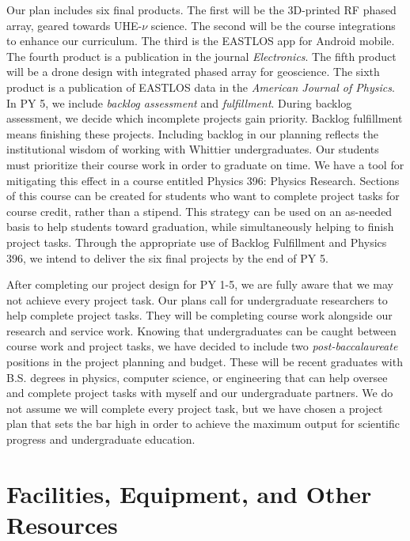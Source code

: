 \documentclass[10pt]{amsart}
\theoremstyle{definition}
\numberwithin{equation}{section}
\begin{document}
Our plan includes six final products.  The first will be the 3D-printed RF phased array, geared towards UHE-$\nu$ science.  The second will be the course integrations to enhance our curriculum.  The third is the EASTLOS app for Android mobile.  The fourth product is a publication in the journal \textit{Electronics}.  The fifth product will be a drone design with integrated phased array for geoscience.  The sixth product is a publication of EASTLOS data in the \textit{American Journal of Physics}.  In PY 5, we include \textit{backlog assessment} and \textit{fulfillment}.  During backlog assessment, we decide which incomplete projects gain priority.  Backlog fulfillment means finishing these projects.  Including backlog in our planning reflects the institutional wisdom of working with Whittier undergraduates.  Our students must prioritize their course work in order to graduate on time.  We have a tool for mitigating this effect in a course entitled Physics 396: Physics Research.  Sections of this course can be created for students who want to complete project tasks for course credit, rather than a stipend.  This strategy can be used on an as-needed basis to help students toward graduation, while simultaneously helping to finish project tasks.  Through the appropriate use of Backlog Fulfillment and Physics 396, we intend to deliver the six final projects by the end of PY 5.

After completing our project design for PY 1-5, we are fully aware that we may not achieve every project task.  Our plans call for undergraduate researchers to help complete project tasks.  They will be completing course work alongside our research and service work.  Knowing that undergraduates can be caught between course work and project tasks, we have decided to include two \textit{post-baccalaureate} positions in the project planning and budget.  These will be recent graduates with B.S. degrees in physics, computer science, or engineering that can help oversee and complete project tasks with myself and our undergraduate partners.  We do not assume we will complete every project task, but we have chosen a project plan that sets the bar high in order to achieve the maximum output for scientific progress and undergraduate education.

\clearpage

\section{Facilities, Equipment, and Other Resources}
\end{document}
